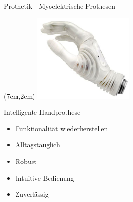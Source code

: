 \documentclass[10pt]{beamer}
\begin{document}
	\begin{frame}{Prothetik - Myoelektrische Prothesen}
		\begin{textblock*}{5cm}(7cm,2cm) %
			\includegraphics[width=5cm]{./pics/michelangelo-hand.jpg}
		\end{textblock*}
		Intelligente Handprothese
		\begin{itemize}
			\item Funktionalität wiederherstellen
			\item Alltagstauglich
			\item Robust
			\item Intuitive Bedienung
			\item Zuverlässig
		\end{itemize}
	\end{frame}
\end{document}
